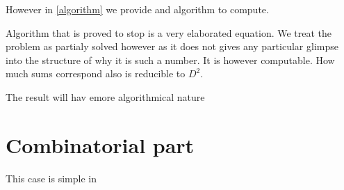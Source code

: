 However in \ref{algorithm} we provide and algorithm to compute.

Algorithm that is proved to stop is a very elaborated equation. 
We treat the problem as partialy solved however as it does not gives any particular glimpse 
into the structure
of why it is such a number. 
It is however computable.
How much sums correspond also is reducible to $D^2$.

The result will hav emore algorithmical nature

\section{Combinatorial part}\label{counting_combinatorics}
This case is simple in 













